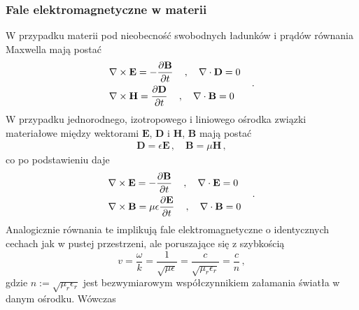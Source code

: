 \documentclass[../main.tex]{subfiles}
\begin{document}
\subsubsection{Fale elektromagnetyczne w materii}
W przypadku materii pod nieobecność swobodnych ładunków i prądów równania Maxwella mają postać
\begin{equation*}
    \begin{split}
        &\nabla\times\mathbf{E}=-\pdv{\mathbf{B}}{t}\quad\,,\quad\nabla\cdot\mathbf{D}=0\\
        &\nabla\times\mathbf{H}=\pdv{\mathbf{D}}{t}\quad\,,\quad\nabla\cdot\mathbf{B}=0
    \end{split}\quad\,.
\end{equation*}
W przypadku jednorodnego, izotropowego i liniowego ośrodka związki materiałowe między wektorami
\(\mathbf{E}\), \(\mathbf{D}\) i \(\mathbf{H}\), \(\mathbf{B}\) mają postać
\begin{equation*}
    \begin{split}
        \mathbf{D}=\epsilon\mathbf{E}\,,\quad\mathbf{B}=\mu\mathbf{H}\,,
    \end{split}
\end{equation*}
co po podstawieniu daje
\begin{equation*}
    \begin{split}
        &\nabla\times\mathbf{E}=-\pdv{\mathbf{B}}{t}\quad\,,\quad\nabla\cdot\mathbf{E}=0\\
        &\nabla\times\mathbf{B}=\mu\epsilon\pdv{\mathbf{E}}{t}\quad\,,\quad\nabla\cdot\mathbf{B}=0
    \end{split}\quad\,.
\end{equation*}
Analogicznie równania te implikują fale elektromagnetyczne o identycznych cechach jak w pustej
przestrzeni, ale poruszające się z szybkością
\begin{equation*}
    v=\frac{\omega}{k}=\frac{1}{\sqrt{\mu\epsilon}}=\frac{c}{\sqrt{\mu_r\epsilon_r}}=\frac{c}{n}\,,
\end{equation*}
gdzie \(n:=\sqrt{\mu_r\epsilon_r}\) jest bezwymiarowym współczynnikiem załamania światła w danym
ośrodku. Wówczas\\
\begin{center}
    \noindent{}
\end{center}
\end{document}
